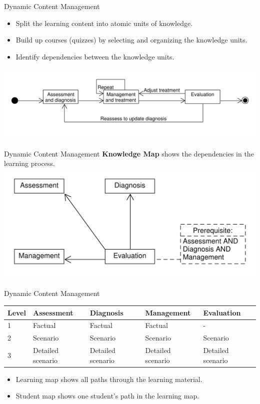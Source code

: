 \documentclass{beamer}
\begin{document}
\begin{frame}{Dynamic Content Management}
\begin{itemize}
	\item Split the learning content into atomic units of knowledge.
	\item Build up courses (quizzes) by selecting and organizing the knowledge units.
	\item Identify dependencies between the knowledge units.
\end{itemize}
\includegraphics[scale=0.44]{WorkflowGraph}
\end{frame}

\begin{frame}{Dynamic Content Management}
\textbf{Knowledge Map} shows the dependencies in the learning process. 
\includegraphics[scale=0.5]{Knowledge}
\end{frame}

\begin{frame}{Dynamic Content Management}
\begin{table}[h!]
\begin{tabular}{|m{2em}|m{6em}|m{6em}|m{6em}|m{6em}|}
	\hline
	 Level & Assessment & Diagnosis & Management & Evaluation \\
	\hline
	1  & Factual & Factual & Factual & - \\
	2 & Scenario & Scenario & Scenario & Scenario \\
	3 & Detailed scenario  & Detailed scenario & Detailed scenario & Detailed scenario \\
	\hline
\end{tabular}
\end{table}
\begin{itemize}
	\item Learning map shows all paths through the learning material.
	\item Student map shows one student's path in the learning map.
\end{itemize}
\end{frame}
\end{document}
